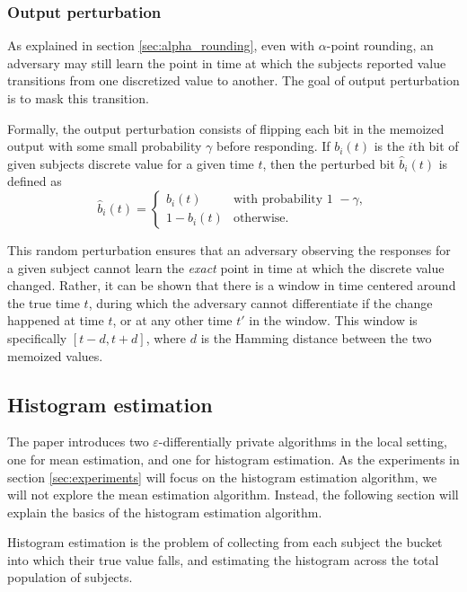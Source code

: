 \documentclass[12pt]{article}
\renewcommand{\epsilon}{\varepsilon}
\begin{document}
\subsubsection{Output perturbation}

As explained in section \ref{sec:alpha_rounding}, even with $\alpha$-point rounding, an adversary may still learn the point in time at which the subjects reported value transitions from one discretized value to another. The goal of output perturbation is to mask this transition.

Formally, the output perturbation consists of flipping each bit in the memoized output with some small probability $\gamma$ before responding. If $b_i(t)$ is the $i$th bit of given subjects discrete value for a given time $t$, then the perturbed bit $\hat{b}_i(t)$ is defined as $$\hat{b}_i(t)=\begin{cases}
b_i(t) & \text{with probability 1 } - \gamma, \\
1 - b_i(t) & \text{otherwise.}
\end{cases}$$

This random perturbation ensures that an adversary observing the responses for a given subject cannot learn the \emph{exact} point in time at which the discrete value changed. Rather, it can be shown \cite[sec.~4]{microsoft_telemetry} that there is a window in time centered around the true time $t$, during which the adversary cannot differentiate if the change happened at time $t$, or at any other time $t'$ in the window. This window is specifically $[t-d, t+d]$, where $d$ is the Hamming distance between the two memoized values.

\subsection{Histogram estimation}

The paper introduces two $\epsilon$-differentially private algorithms in the local setting, one for mean estimation, and one for histogram estimation. As the experiments in section \ref{sec:experiments} will focus on the histogram estimation algorithm, we will not explore the mean estimation algorithm. Instead, the following section will explain the basics of the histogram estimation algorithm. \bigskip

Histogram estimation is the problem of collecting from each subject the bucket into which their true value falls, and estimating the histogram across the total population of subjects.
\end{document}
